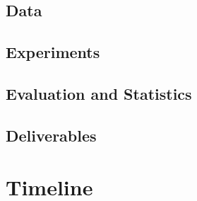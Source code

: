 \documentclass{article}
\begin{document}
\subsection{Data}
\subsection{Experiments}
\subsection{Evaluation and Statistics}
\subsection{Deliverables}
\section{Timeline}
\printbibliography
\end{document}
